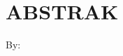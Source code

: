 \clearpage
\chapter*{ABSTRAK}

\begin{center}
    \center
    \begin{singlespace}
      \large\bfseries\MakeUppercase{}
  
      \normalfont\normalsize
      By:
  
      \bfseries \theauthor
    \end{singlespace}
\end{center} 


    
\clearpage

\clearpage